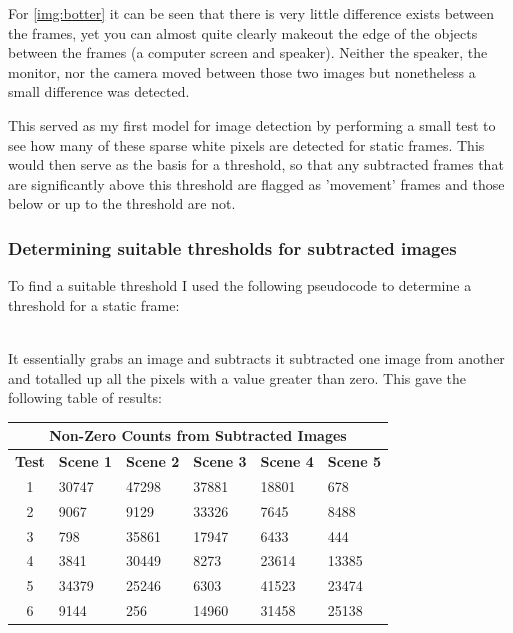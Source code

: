 {{For \cref{img:botter} it can be seen that there is very little difference exists between the frames, yet you can almost quite clearly makeout the edge of the objects between the frames (a computer screen and speaker). Neither the speaker, the monitor, nor the camera moved between those two images but nonetheless a small difference was detected.

This served as my first model for image detection by performing a small test to see how many of these sparse white pixels are detected for static frames. This would then serve as the basis for a threshold, so that any subtracted frames that are significantly above this threshold are flagged as 'movement' frames and those below or up to the threshold 
are not.
\pagebreak

\subsubsection{Determining suitable thresholds for subtracted images}
To find a suitable threshold I used the following pseudocode to determine a threshold for a static frame:\\\\
\begin{frame}{}
	\vspace{-40pt}
	
\end{frame}
It essentially grabs an image and subtracts it subtracted one image from another and totalled up all the pixels with a value greater than zero. This gave the following table of results:
\begin{center}
\begin{table}[!htbp]
	\begin{center}
	\begin{tabular}{| c | l | l | l | l | l | }
\hline
\multicolumn{6}{|c|}{\bf Non-Zero Counts from Subtracted Images} \\
\hline
\bf Test	&\bf Scene 1	&\bf Scene 2	&\bf Scene 3	&\bf Scene 4	&\bf Scene 5	\\ \hline
1	&30747	&47298	&37881	&18801	&678\\
2	&9067	&9129	&33326	&7645	&8488\\
3	&798	&35861	&17947	&6433	&444\\
4	&3841	&30449	&8273	&23614	&13385\\
5	&34379	&25246	&6303	&41523	&23474\\
6	&9144	&256	&14960	&31458	&25138\\

\end{tabular}
\end{center}
\end{table}
\end{center}}}
